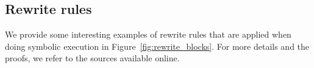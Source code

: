 
\subsection{Rewrite rules}

We provide some interesting examples of rewrite rules that are applied when doing symbolic execution in Figure~\ref{fig:rewrite_blocks}.
For more details and the proofs, we refer to the sources available online.

